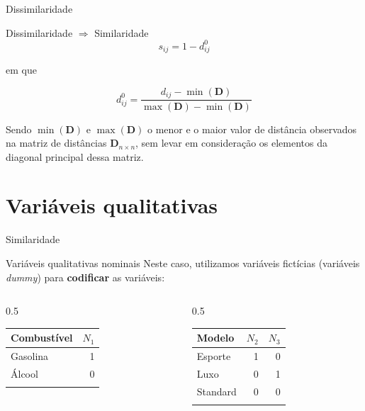 \documentclass[
  ignorenonframetext,
  aspectratio=169,
]{beamer}
\newcounter{none} %
\begin{document}
\begin{frame}{Dissimilaridade}
\protect{}\label{dissimilaridade-6}
\begin{block}{Dissimilaridade \(\Longrightarrow\) Similaridade}
\protect{}\label{dissimilaridade-longrightarrow-similaridade}
\[s_{ij} = 1 - d_{ij}^0\]

em que

\[d_{ij}^0 = \displaystyle{\frac{d_{ij} - \min(\boldsymbol{D})}{\max(\boldsymbol{D}) - \min(\boldsymbol{D})}}\]

Sendo \(\min(\boldsymbol{D})\) e \(\max(\boldsymbol{D})\) o menor e o
maior valor de distância observados na matriz de distâncias
\(\boldsymbol{D}_{n \times n}\), sem levar em consideração os elementos
da diagonal principal dessa matriz.
\end{block}
\end{frame}

\section{Variáveis qualitativas}\label{variuxe1veis-qualitativas}

\begin{frame}{Similaridade}
\protect{}\label{similaridade}
\begin{block}{Variáveis qualitativas nominais}
\protect{}\label{variuxe1veis-qualitativas-nominais}
Neste caso, utilizamos variáveis fictícias (variáveis \emph{dummy}) para
\textbf{codificar} as variáveis:

\begin{columns}[T]
\begin{column}{0.5\linewidth}
{\def\LTcaptype{none} %
\begin{longtable}[]{@{}lr@{}}
\toprule\noalign{}
Combustível & \(N_1\) \\
\midrule\noalign{}
\endhead
Gasolina & 1 \\
Álcool & 0 \\
\bottomrule\noalign{}
\end{longtable}
}
\end{column}

\begin{column}{0.5\linewidth}
{\def\LTcaptype{none} %
\begin{longtable}[]{@{}lrr@{}}
\toprule\noalign{}
Modelo & \(N_2\) & \(N_3\) \\
\midrule\noalign{}
\endhead
Esporte & 1 & 0 \\
Luxo & 0 & 1 \\
Standard & 0 & 0 \\
\bottomrule\noalign{}
\end{longtable}
}
\end{column}
\end{columns}
\end{block}
\end{frame}
\end{document}
